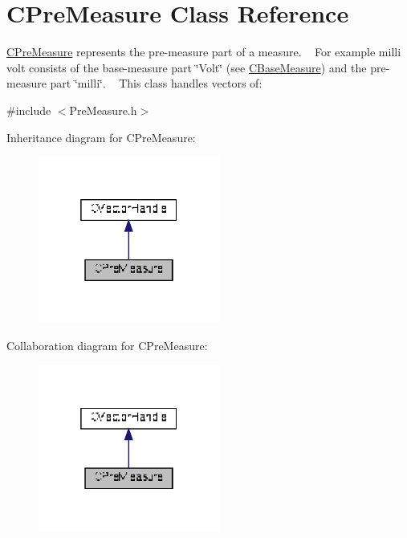 \hypertarget{classCPreMeasure}{}\section{C\+Pre\+Measure Class Reference}
\label{classCPreMeasure}


\hyperlink{classCPreMeasure}{C\+Pre\+Measure} represents the pre-\/measure part of a measure. ~\newline
 For example milli volt consists of the base-\/measure part \char`\"{}\+Volt\char`\"{} (see \hyperlink{classCBaseMeasure}{C\+Base\+Measure}) and the pre-\/measure part \char`\"{}milli\char`\"{}. ~\newline
 This class handles vectors of\+:  




{\ttfamily \#include $<$Pre\+Measure.\+h$>$}



Inheritance diagram for C\+Pre\+Measure\+:\nopagebreak
\begin{figure}[H]
\begin{center}
\leavevmode
\includegraphics[width=169pt]{d9/da8/classCPreMeasure__inherit__graph}
\end{center}
\end{figure}


Collaboration diagram for C\+Pre\+Measure\+:\nopagebreak
\begin{figure}[H]
\begin{center}
\leavevmode
\includegraphics[width=169pt]{d4/d1d/classCPreMeasure__coll__graph}
\end{center}
\end{figure}
